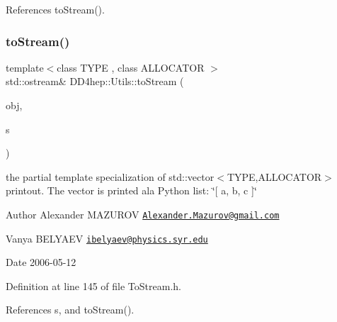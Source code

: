References to\+Stream().

\hypertarget{namespace_d_d4hep_1_1_utils_a9018241e575dafecf003bf871b8d6ef1}{}\label{namespace_d_d4hep_1_1_utils_a9018241e575dafecf003bf871b8d6ef1} 
\subsubsection{\texorpdfstring{to\+Stream()}{toStream()}\hspace{0.1cm}{\footnotesize\ttfamily [9/22]}}
{\footnotesize\ttfamily template$<$class T\+Y\+PE , class A\+L\+L\+O\+C\+A\+T\+OR $>$ \\
std\+::ostream\& D\+D4hep\+::\+Utils\+::to\+Stream (\begin{DoxyParamCaption}\item[{const std\+::vector$<$ T\+Y\+PE, A\+L\+L\+O\+C\+A\+T\+OR $>$ \&}]{obj,  }\item[{std\+::ostream \&}]{s }\end{DoxyParamCaption})\hspace{0.3cm}{\ttfamily [inline]}}

the partial template specialization of {\ttfamily std\+::vector$<$\+T\+Y\+P\+E,\+A\+L\+L\+O\+C\+A\+T\+O\+R$>$} printout. The vector is printed a\textquotesingle{}la Python list\+: \char`\"{}\mbox{[} a, b, c \mbox{]}\char`\"{} \begin{DoxyAuthor}{Author}
Alexander M\+A\+Z\+U\+R\+OV \href{mailto:Alexander.Mazurov@gmail.com}{\tt Alexander.\+Mazurov@gmail.\+com} 

Vanya B\+E\+L\+Y\+A\+EV \href{mailto:ibelyaev@physics.syr.edu}{\tt ibelyaev@physics.\+syr.\+edu} 
\end{DoxyAuthor}
\begin{DoxyDate}{Date}
2006-\/05-\/12 
\end{DoxyDate}


Definition at line 145 of file To\+Stream.\+h.



References s, and to\+Stream().

\hypertarget{namespace_d_d4hep_1_1_utils_aaa747cec6fddff24617f88f07fe5240f}{}\label{namespace_d_d4hep_1_1_utils_aaa747cec6fddff24617f88f07fe5240f} 
